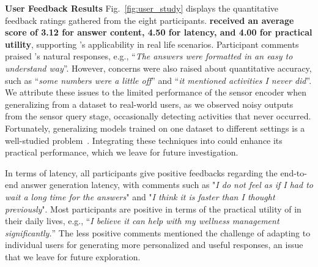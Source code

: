 \textbf{User Feedback Results}
Fig.~\ref{fig:user_study} displays the quantitative feedback ratings gathered from the eight participants. \textbf{\Method received an average score of 3.12 for answer content, 4.50 for latency, and 4.00 for practical utility}, supporting \Method's applicability in real life scenarios.
Participant comments praised \Method's natural responses, e.g., ``\textit{The answers were formatted in an easy to understand way}''.
However, concerns were also raised about quantitative accuracy, such as ``\textit{some numbers were a little off}'' and ``\textit{it mentioned activities I never did}''.
We attribute these issues to the limited performance of the sensor encoder when generalizing from a dataset to real-world users, as we observed noisy outputs from the sensor query stage, occasionally detecting activities that never occurred.
Fortunately, generalizing models trained on one dataset to different settings is a well-studied problem~\cite{xu2023practically}. Integrating these techniques into \Method could enhance its practical performance, which we leave for future investigation.

In terms of latency, all participants give positive feedbacks regarding the end-to-end answer generation latency, with comments such as "\textit{I do not feel as if I had to wait a long time for the answers}" and "\textit{I think it is faster than I thought previously}".
Most participants are positive in terms of the practical utility of \Method in their daily lives, e.g., ``\textit{I believe it can help with my wellness management significantly.}'' The less positive comments mentioned the challenge of adapting \Method to individual users for generating more personalized and useful responses, an issue that we leave for future exploration.



